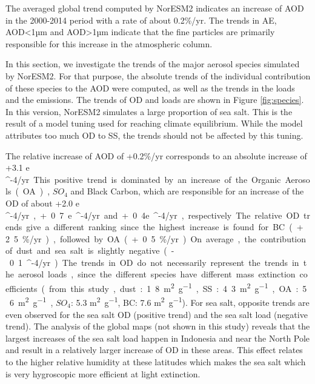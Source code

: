 \documentclass[journal abbreviation, manuscript]{copernicus}
\begin{document}
The averaged global trend computed by NorESM2 indicates an increase of AOD in the 2000-2014 period with a rate of about 0.2\%/yr. The trends in AE, AOD<1µm and AOD>1µm indicate that the fine particles are primarily responsible for this increase in the atmospheric column.

In this section, we investigate the trends of the major aerosol species simulated by NorESM2. For that purpose, the absolute trends of the individual contribution of these species to the AOD were computed, as well as the trends in the loads and the emissions. The trends of OD and loads are shown in Figure \ref{fig:species}. In this version, NorESM2 simulates a large proportion of sea salt. This is the result of a model tuning used for reaching climate equilibrium. While the model attributes too much OD to SS, the trends should not be affected by this tuning.

The relative increase of AOD of +0.2\%/yr corresponds to an absolute increase of +3.1 e \unit{^{-4}/yr}. This positive trend is dominated by an increase of the Organic Aerosols (OA), $SO_{4}$ and Black Carbon, which are responsible for an increase of the OD of about +2.0 e \unit{^{-4}/yr}, +0.7 e \unit{^{-4}/yr} and +0.4e \unit{^{-4}/yr}, respectively. The relative OD trends give a different ranking since the highest increase is found for BC (+2.5\%/yr), followed by OA (+0.5 \%/yr). On average, the contribution of dust and sea salt is slightly negative (-0.1 \unit{^{-4}/yr}).

The trends in OD do not necessarily represent the trends in the aerosol loads, since the different species have different mass extinction coefficients (from this study, dust: 1.8 \unit{m^{2}.g^{-1}}, SS: 4.3 \unit{m^{2}.g^{-1}}, OA: 5.6 \unit{m^{2}.g^{-1}}, $SO_{4}$: 5.3 \unit{m^{2}.g^{-1}}, BC: 7.6 \unit{m^{2}.g^{-1}}). For sea salt, opposite trends are even observed for the sea salt OD (positive trend) and the sea salt load (negative trend). The analysis of the global maps (not shown in this study) reveals that the largest increases of the sea salt load  happen in Indonesia and near the North Pole and result in a relatively larger increase of OD in these areas. This effect relates to the higher relative humidity at these latitudes which makes the sea salt which is very hygroscopic more efficient at light extinction.


\conclusions  %
\end{document}
